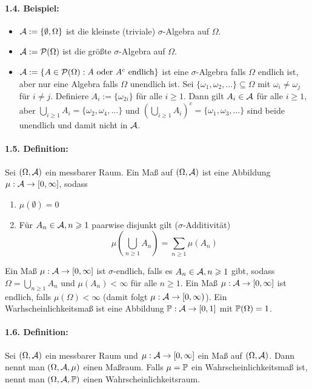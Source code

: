\documentclass[12pt]{report}
\begin{document}
\paragraph{1.4. Beispiel:}
\begin{itemize}
    \item $\mathcal{A}:=\{\emptyset,\Omega\}$ ist die kleinste (triviale) $\sigma$-Algebra auf $\Omega$.
    \item $\mathcal{A}:=\mathcal{P}(\Omega)$ ist die gr\"o\ss{}te $\sigma$-Algebra auf $\Omega$.
    \item $\mathcal{A}:=\{A\in\mathcal{P}(\Omega):A\text{ oder }A^c\text{ endlich}\}$ ist eine $\sigma$-Algebra falls $\Omega$ endlich ist, aber nur eine Algebra falls $\Omega$ unendlich ist. Sei $\{\omega_1,\omega_2,\hdots\}\subseteq\Omega$ mit $\omega_i\neq\omega_j$ f\"ur $i\neq j$. Definiere $A_i:=\{\omega_{2i}\}$ f\"ur alle $i\geq1$. Dann gilt $A_i\in\mathcal{A}$ f\"ur alle $i\geq1$, aber $\bigcup_{i\geq1}A_i=\{\omega_2,\omega_4,\hdots\}$ und $\left(\bigcup_{i\geq1}A_i\right)^c=\{\omega_1,\omega_3,\hdots\}$ sind beide unendlich und damit nicht in $\mathcal{A}$.
\end{itemize}

\paragraph{1.5. Definition:}Sei $(\Omega,\mathcal{A})$ ein messbarer Raum.
Ein Ma\ss{} auf $(\Omega,\mathcal{A})$ ist eine Abbildung $\mu:\mathcal{A}\to[0,\infty]$, sodass 
    \begin{enumerate}[label=(\roman*)]
        \item $\mu(\emptyset)=0$
        \item F\"ur $A_n\in\mathcal{A},n\geqslant1$ paarwise disjunkt gilt ($\sigma$-Additivit\"at)
        $$\mu\left(\bigcup_{n\geq1}A_n\right)=\sum_{n\geq1}\mu(A_n)$$
    \end{enumerate}
Ein Ma\ss{} $\mu:\mathcal{A}\to[0,\infty]$ ist $\sigma$-endlich, falls es $A_n\in\mathcal{A},n\geqslant1$ gibt, sodass $\Omega=\displaystyle\bigcup_{n\geq1}A_n$ und $\mu(A_n)<\infty$ f\"ur alle $n\geq1$. Ein Ma\ss{} $\mu:\mathcal{A}\to[0,\infty]$ ist endlich, falls $\mu(\Omega)<\infty$ (damit folgt $\mu:\mathcal{A}\to[0,\infty)$). Ein Warhscheinlichkeitsma\ss{} ist eine Abbildung $\mathbb{P}:\mathcal{A}\to[0,1]$ mit $\mathbb{P}(\Omega)=1$. 

\paragraph{1.6. Definition:} Sei $(\Omega,\mathcal{A})$ ein messbarer Raum und $\mu:\mathcal{A}\to[0,\infty]$ ein Ma\ss{} auf $(\Omega,\mathcal{A})$. Dann nennt man $(\Omega,\mathcal{A},\mu)$ einen Ma\ss{}raum. Falls $\mu=\mathbb{P}$ ein Wahrscheinlichkeitsma\ss{} ist, nennt man $(\Omega, \mathcal{A}, \mathbb{P})$ einen Wahrscheinlichkeitsraum.
\end{document}
